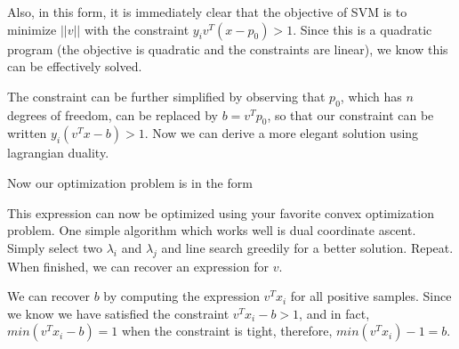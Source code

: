 \documentclass[12pt]{article}
\begin{document}
Also, in this form, it is immediately clear that the objective of SVM is to minimize $||v||$ with the constraint $y_i v^T(x-p_0) > 1$. Since this is a quadratic program (the objective is quadratic and the constraints are linear), we know this can be effectively solved.

The constraint can be further simplified by observing that $p_0$, which has $n$ degrees of freedom, can be replaced by $b = v^Tp_0$, so that our constraint can be written $y_i (v^Tx - b) > 1$. Now we can derive a more elegant solution using lagrangian duality. 


Now our optimization problem is in the form

This expression can now be optimized using your favorite convex optimization problem. One simple algorithm which works well is dual coordinate ascent. Simply select two $\lambda_i$ and $\lambda_j$ and line search greedily for a better solution. Repeat. When finished, we can recover an expression for $v$.

We can recover $b$ by computing the expression $v^Tx_i$ for all positive samples. Since we know we have satisfied the constraint $v^Tx_i - b > 1$, and in fact, $min(v^Tx_i -b) = 1$ when the constraint is tight, therefore, $min(v^Tx_i)-1 = b$. 
\end{document}
